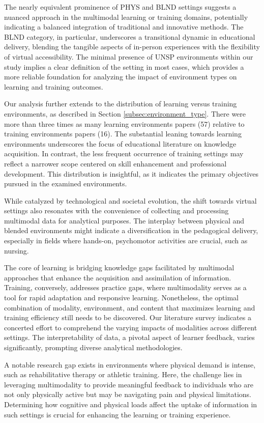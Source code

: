 \documentclass[manuscript,screen,review]{acmart}
\begin{document}
The nearly equivalent prominence of PHYS and BLND settings suggests a nuanced approach in the multimodal learning or training domains, potentially indicating a balanced integration of traditional and innovative methods. The BLND category, in particular, underscores a transitional dynamic in educational delivery, blending the tangible aspects of in-person experiences with the flexibility of virtual accessibility.
The minimal presence of UNSP environments within our study implies a clear definition of the setting in most cases, which provides a more reliable foundation for analyzing the impact of environment types on learning and training outcomes.

Our analysis further extends to the distribution of learning versus training environments, as described in Section \ref{subsec:environment_type}. There were more than three times as many learning environments papers (57) relative to training environments papers (16). The substantial leaning towards learning environments underscores the focus of educational literature on knowledge acquisition. In contrast, the less frequent occurrence of training settings may reflect a narrower scope centered on skill enhancement and professional development. This distribution is insightful, as it indicates the primary objectives pursued in the examined environments.

While catalyzed by technological and societal evolution, the shift towards virtual settings also resonates with the convenience of collecting and processing multimodal data for analytical purposes. The interplay between physical and blended environments might indicate a diversification in the pedagogical delivery, especially in fields where hands-on, psychomotor activities are crucial, such as nursing.

The core of learning is bridging knowledge gaps facilitated by multimodal approaches that enhance the acquisition and assimilation of information. Training, conversely, addresses practice gaps, where multimodality serves as a tool for rapid adaptation and responsive learning. Nonetheless, the optimal combination of modality, environment, and content that maximizes learning and training efficiency still needs to be discovered. Our literature survey indicates a concerted effort to comprehend the varying impacts of modalities across different settings. The interpretability of data, a pivotal aspect of learner feedback, varies significantly, prompting diverse analytical methodologies.

A notable research gap exists in environments where physical demand is intense, such as rehabilitative therapy or athletic training. Here, the challenge lies in leveraging multimodality to provide meaningful feedback to individuals who are not only physically active but may be navigating pain and physical limitations. Determining how cognitive and physical loads affect the uptake of information in such settings is crucial for enhancing the learning or training experience.
\end{document}
